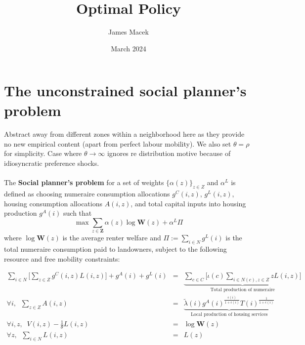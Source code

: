 \documentclass[11pt]{article}
\title{Optimal Policy}
\author{James Macek}
\date{March 2024}
\begin{document}
	
	\maketitle

	
	\section{The unconstrained social planner's problem}
	
	\paragraph*{}
	Abstract away from different zones within a neighborhood here as they provide no new empirical content (apart from perfect labour mobility). We also set $\theta = \rho$ for simplicity. Case where $\theta \to \infty$ ignores re distribution motive because of idiosyncratic preference shocks.
	
	\paragraph*{}
	The \textbf{Social planner's problem} for a set of weights $\{\alpha(z)\}_{z \in Z}$ and $\alpha^{L}$ is defined as choosing numeraire consumption allocations $g^{C}(i, z)$, $g^{L}(i, z)$, housing consumption allocations $A(i, z)$, and total capital inputs into housing production $g^{A}(i)$ such that
	\begin{equation}
		\max   \sum_{z \in \boldsymbol{Z}}\alpha(z)\log \boldsymbol{W}(z) +\alpha^{L}\Pi
	\end{equation}
	where $\log \boldsymbol{W}(z)$ is the average renter welfare and $\Pi:= \sum_{i \in N}g^{L}(i)$ is the total numeraire consumption paid to landowners, subject to the following resource and free mobility constraints:
	
	\begin{eqnarray}
		\sum_{i \in N}\big[\sum_{z \in Z}g^{C}(i, z)L(i, z)\big] + g^{A}(i) + g^{L}(i)& = & \underbrace{\sum_{c \in C}\bigg[\iota(c)\sum_{i \in N(c), z \in Z}zL(i, z) \bigg]}_{\text{Total production of numeraire}} \\
		\forall i, \; \; \sum_{z \in Z}A(i, z) & = & \underbrace{\tilde{\lambda}(i)g^{A}(i)^{\frac{\epsilon(i)}{1 + \epsilon(i)}}T(i)^{\frac{1}{1 + \epsilon(i)}}}_{\text{Local production of housing services}} \\
		\forall i, z,	\; \; V(i, z) - \frac{1}{\theta}L(i, z)	 & = & \log \boldsymbol{W}(z)	\\
		\forall z,	\; \;\sum_{i \in N}L(i, z) & = & L(z)	
	\end{eqnarray}
	
\end{document}

